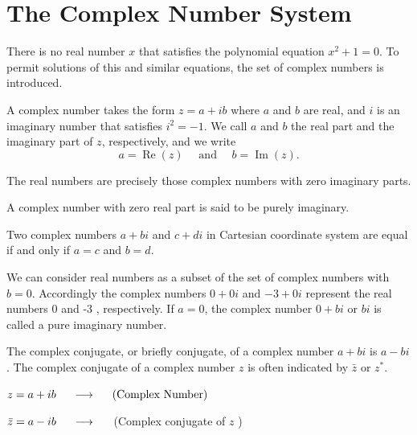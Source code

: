 \section{The Complex Number System}
There is no real number $x$ that satisfies the polynomial equation $x^2+1=0$. To permit solutions of this and similar equations, the set of complex numbers is introduced.
\begin{defn}
    A complex number takes the form $z=a+i b$ where $a$ and $b$ are real, and $i$ is an imaginary number that satisfies $i^2=-1$. We call $a$ and $b$ the real part and the imaginary part of $z$, respectively, and we write
$$
a=\operatorname{Re}(z) \quad \text { and } \quad b=\operatorname{Im}(z) .
$$
\end{defn}
\noindent The real numbers are precisely those complex numbers with zero imaginary parts. 
\begin{defn}
    A complex number with zero real part is said to be purely imaginary.
\end{defn}
\begin{theorem}
    Two complex numbers $a+b i$ and $c+d i$ in Cartesian coordinate system are equal if and only if $a=c$ and $b=d$.
\end{theorem}
\noindent  We can consider real numbers as a subset of the set of complex numbers with $b=0$. Accordingly the complex numbers $0+0 i$ and $-3+0 i$ represent the real numbers 0 and -3 , respectively. If $a=0$, the complex number $0+b i$ or $b i$ is called a pure imaginary number.
\begin{defn}
    The complex conjugate, or briefly conjugate, of a complex number $a+b i$ is $a-b i$. The complex conjugate of a complex number $z$ is often indicated by $\bar{z}$ or $z^*$.
    \begin{center}
    $ z=a+i b \hspace{0.5cm} \longrightarrow \hspace{0.5cm} \text{(Complex Number)}$\par 
$\bar{z}=a-i b  \hspace{0.5cm} \longrightarrow \hspace{0.5cm}$ (Complex conjugate of $z$ )
\end{center}
\end{defn}
